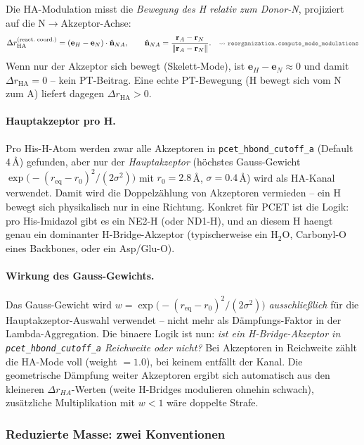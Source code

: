 \documentclass[11pt,a4paper,twoside]{article}
\newcommand{\codref}[1]{%
  \quad\text{\textcolor{gray!70!black}{\footnotesize $\rightsquigarrow$~\texttt{#1}}}}
\theoremstyle{remark}
\begin{document}
Die HA-Modulation misst die
\emph{Bewegung des H relativ zum Donor-N}, projiziert auf die
N$\to$Akzeptor-Achse:
\begin{equation}
  \Delta r_\text{HA}^\text{(react.\ coord.)}
  = (\mathbf{e}_H - \mathbf{e}_N) \cdot \hat{\mathbf{n}}_{NA},
  \qquad
  \hat{\mathbf{n}}_{NA} = \frac{\mathbf{r}_A - \mathbf{r}_N}{\|\mathbf{r}_A - \mathbf{r}_N\|}.
  \codref{reorganization.compute\_mode\_modulations}
  \label{eq:dr-reaction-coord}
\end{equation}
Wenn nur der Akzeptor sich bewegt (Skelett-Mode), ist
$\mathbf{e}_H - \mathbf{e}_N \approx 0$ und damit
$\Delta r_\text{HA} = 0$ -- kein PT-Beitrag. Eine echte PT-Bewegung
(H bewegt sich vom N zum A) liefert dagegen $\Delta r_\text{HA} > 0$.

\paragraph{Hauptakzeptor pro H.}
Pro His-H-Atom werden zwar alle Akzeptoren in
\texttt{pcet\_hbond\_cutoff\_a} (Default 4\,\AA) gefunden, aber nur
der \emph{Hauptakzeptor} (h\"ochstes Gauss-Gewicht
$\exp\bigl(-(r_{\text{eq}} - r_0)^2/(2\sigma^2)\bigr)$ mit
$r_0 = 2.8$\,\AA, $\sigma = 0.4$\,\AA) wird als HA-Kanal verwendet.
Damit wird die Doppelz\"ahlung von Akzeptoren vermieden -- ein
H bewegt sich physikalisch nur in eine Richtung. Konkret f\"ur PCET ist
die Logik: pro His-Imidazol gibt es ein NE2-H (oder ND1-H), und an
diesem H haengt genau ein dominanter H-Bridge-Akzeptor (typischerweise
ein H$_2$O, Carbonyl-O eines Backbones, oder ein Asp/Glu-O).

\paragraph{Wirkung des Gauss-Gewichts.}
Das Gauss-Gewicht wird
$w = \exp\bigl(-(r_{\text{eq}} - r_0)^2/(2\sigma^2)\bigr)$
\emph{ausschlie{\ss}lich} f\"ur die Hauptakzeptor-Auswahl verwendet --
nicht mehr als D\"ampfungs-Faktor in der Lambda-Aggregation. Die binaere
Logik ist nun: \emph{ist ein H-Bridge-Akzeptor in
\texttt{pcet\_hbond\_cutoff\_a} Reichweite oder nicht?} Bei Akzeptoren
in Reichweite z\"ahlt die HA-Mode voll (weight $= 1.0$), bei keinem
entf\"allt der Kanal. Die geometrische D\"ampfung weiter Akzeptoren
ergibt sich automatisch aus den kleineren $\Delta r_{HA}$-Werten
(weite H-Bridges modulieren ohnehin schwach), zus\"atzliche
Multiplikation mit $w < 1$ w\"are doppelte Strafe.

\subsubsection*{Reduzierte Masse: zwei Konventionen}
\end{document}
